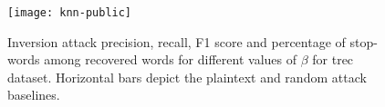 \begin{figure}[h]
	\centering
	\texttt{[image: knn-public]} %
	\caption[Inversion attack accuracy metrics for different values of $\beta$ for \acrshort{trec} dataset]{
		Inversion attack precision, recall, F1 score and percentage of stop-words among recovered words for different values of $\beta$ for \acrshort{trec} dataset.
		Horizontal bars depict the plaintext and random attack baselines.
	}\label{figure:knn-public}
\end{figure}

